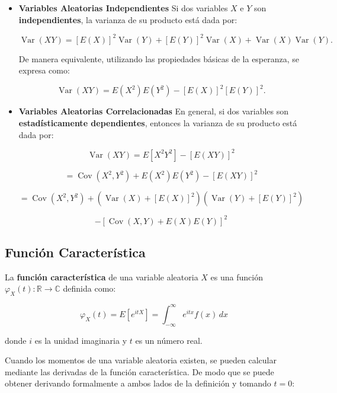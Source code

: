 \begin{itemize}
    \item \textbf{Variables Aleatorias Independientes}
          Si dos variables \(X\) e \(Y\) son \textbf{independientes}, la varianza de su producto está dada por:

          \[
              \operatorname{Var}(XY) = [E(X)]^2 \operatorname{Var}(Y) + [E(Y)]^2 \operatorname{Var}(X) + \operatorname{Var}(X) \operatorname{Var}(Y).
          \]

          De manera equivalente, utilizando las propiedades básicas de la esperanza, se
          expresa como:

          \[
              \operatorname{Var}(XY) = E(X^2) E(Y^2) - [E(X)]^2 [E(Y)]^2.
          \]
    \item \textbf{Variables Aleatorias Correlacionadas}
          En general, si dos variables son \textbf{estadísticamente dependientes}, entonces la varianza de su producto está dada por:

          \[
              \operatorname{Var}(XY) = E[X^2 Y^2] - [E(XY)]^2
          \]

          \[
              = \operatorname{Cov}(X^2, Y^2) + E(X^2) E(Y^2) - [E(XY)]^2
          \]

          \[
              = \operatorname{Cov}(X^2, Y^2) + (\operatorname{Var}(X) + [E(X)]^2)(\operatorname{Var}(Y) + [E(Y)]^2)
          \]

          \[
              - [\operatorname{Cov}(X, Y) + E(X) E(Y)]^2
          \]

\end{itemize}

\subsection{Función Característica}

\begin{definición}
    La \textbf{función característica} de una variable aleatoria \( X \) es una función $\varphi_X(t) : \mathbb{R} \to \mathbb{C}$ definida como:

    \[
        \varphi_X(t) = E[e^{itX}] = \int_{-\infty}^{\infty} e^{itx} f(x) \, dx
    \]

    donde \( i \) es la unidad imaginaria y \( t \) es un número real.
\end{definición}

Cuando los momentos de una variable aleatoria existen, se pueden calcular mediante las derivadas de la función característica. De modo que se puede obtener derivando formalmente a ambos lados de la definición y tomando \( t = 0 \):

